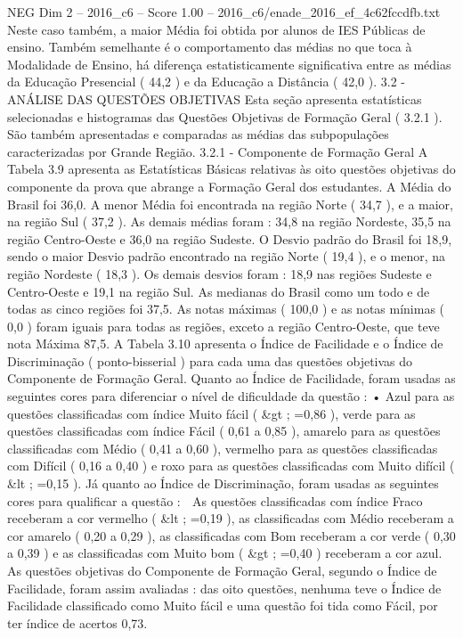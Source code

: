 \begin{textsample}{NEG Dim 2 – 2016\_c6 – Score 1.00 – 2016\_c6/enade\_2016\_ef\_4c62fccdfb.txt}
Neste caso também, a maior Média foi obtida por alunos de IES Públicas de ensino.
Também semelhante é o comportamento das médias no que toca à Modalidade de Ensino, há diferença estatisticamente significativa entre as médias da Educação Presencial ( 44,2 ) e da Educação a Distância ( 42,0 ). 3.2 - ANÁLISE DAS QUESTÕES OBJETIVAS Esta seção apresenta estatísticas selecionadas e histogramas das Questões Objetivas de Formação Geral ( 3.2.1 ).
São também apresentadas e comparadas as médias das subpopulações caracterizadas por Grande Região. 3.2.1 - Componente de Formação Geral A Tabela 3.9 apresenta as Estatísticas Básicas relativas às oito questões objetivas do componente da prova que abrange a Formação Geral dos estudantes.
A Média do Brasil foi 36,0.
A menor Média foi encontrada na região Norte ( 34,7 ), e a maior, na região Sul ( 37,2 ).
As demais médias foram : 34,8 na região Nordeste, 35,5 na região Centro-Oeste e 36,0 na região Sudeste.
O Desvio padrão do Brasil foi 18,9, sendo o maior Desvio padrão encontrado na região Norte ( 19,4 ), e o menor, na região Nordeste ( 18,3 ).
Os demais desvios foram : 18,9 nas regiões Sudeste e Centro-Oeste e 19,1 na região Sul.
As medianas do Brasil como um todo e de todas as cinco regiões foi 37,5.
As notas máximas ( 100,0 ) e as notas mínimas ( 0,0 ) foram iguais para todas as regiões, exceto a região Centro-Oeste, que teve nota Máxima 87,5.
A Tabela 3.10 apresenta o Índice de Facilidade e o Índice de Discriminação ( ponto-bisserial ) para cada uma das questões objetivas do Componente de Formação Geral.
Quanto ao Índice de Facilidade, foram usadas as seguintes cores para diferenciar o nível de dificuldade da questão : • Azul para as questões classificadas com índice Muito fácil ( \&gt ; =0,86 ), verde para as questões classificadas com índice Fácil ( 0,61 a 0,85 ), amarelo para as questões classificadas com Médio ( 0,41 a 0,60 ), vermelho para as questões classificadas com Difícil ( 0,16 a 0,40 ) e roxo para as questões classificadas com Muito difícil ( \&lt ; =0,15 ).
Já quanto ao Índice de Discriminação, foram usadas as seguintes cores para qualificar a questão :  As questões classificadas com índice Fraco receberam a cor vermelho ( \&lt ; =0,19 ), as classificadas com Médio receberam a cor amarelo ( 0,20 a 0,29 ), as classificadas com Bom receberam a cor verde ( 0,30 a 0,39 ) e as classificadas com Muito bom ( \&gt ; =0,40 ) receberam a cor azul.
As questões objetivas do Componente de Formação Geral, segundo o Índice de Facilidade, foram assim avaliadas : das oito questões, nenhuma teve o Índice de Facilidade classificado como Muito fácil e uma questão foi tida como Fácil, por ter índice de acertos 0,73.

\end{textsample}
